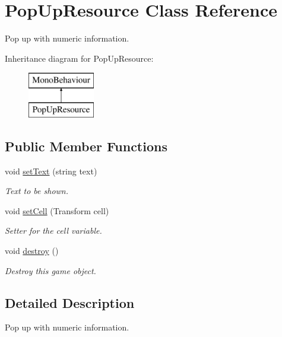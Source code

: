 \hypertarget{class_pop_up_resource}{}\section{Pop\+Up\+Resource Class Reference}
\label{class_pop_up_resource}


Pop up with numeric information.  


Inheritance diagram for Pop\+Up\+Resource\+:\begin{figure}[H]
\begin{center}
\leavevmode
\includegraphics[height=2.000000cm]{class_pop_up_resource}
\end{center}
\end{figure}
\subsection*{Public Member Functions}
\begin{DoxyCompactItemize}
\item 
void \mbox{\hyperlink{class_pop_up_resource_ab6419b13f96e0a691c259e030b160bff}{set\+Text}} (string text)
\begin{DoxyCompactList}\small\item\em Text to be shown. \end{DoxyCompactList}\item 
void \mbox{\hyperlink{class_pop_up_resource_a9257e3aa653c54790abb63d55bee2190}{set\+Cell}} (Transform cell)
\begin{DoxyCompactList}\small\item\em Setter for the cell variable. \end{DoxyCompactList}\item 
void \mbox{\hyperlink{class_pop_up_resource_a50e433efaee2506bb7aeaf46692f80bc}{destroy}} ()
\begin{DoxyCompactList}\small\item\em Destroy this game object. \end{DoxyCompactList}\end{DoxyCompactItemize}


\subsection{Detailed Description}
Pop up with numeric information. 



